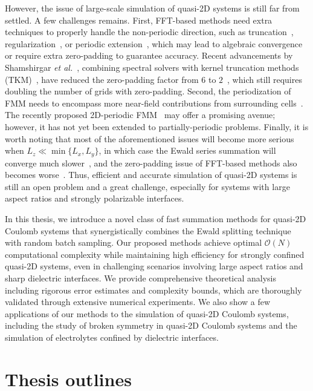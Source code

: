 However, the issue of large-scale simulation of quasi-2D systems is still far from settled.
A few challenges remains. First, FFT-based methods need extra techniques to properly handle the non-periodic direction, such as truncation~\cite{parry1975electrostatic}, regularization~\cite{nestler2015fast}, or periodic extension~\cite{lindbo2012fast}, which may lead to algebraic convergence or require extra zero-padding to guarantee accuracy. 
Recent advancements by Shamshirgar \emph{et al.}~\cite{shamshirgar2021fast}, combining spectral solvers with kernel truncation methods (TKM)~\cite{vico2016fast}, have reduced the zero-padding factor from $6$ to $2$~\cite{lindbo2012fast}, which still requires doubling the number of grids with zero-padding. 
Second, the periodization of FMM needs to encompass more near-field contributions from surrounding cells~\cite{yan2018flexibly,barnett2018unified}. The recently proposed 2D-periodic FMM~\cite{PEI2023111792} may offer a promising avenue; however, it has not yet been extended to partially-periodic problems.
Finally, it is worth noting that most of the aforementioned issues will become more serious when $L_z\ll \min\{L_x, L_y\}$, in which case the Ewald series summation will converge much slower~\cite{arnold2002electrostatics}, and the zero-padding issue of FFT-based methods also becomes worse~\cite{maxian2021fast}.
Thus, efficient and accurate simulation of quasi-2D systems is still an open problem and a great challenge, especially for systems with large aspect ratios and strongly polarizable interfaces.


In this thesis, we introduce a novel class of fast summation methods for quasi-2D Coulomb systems that synergistically combines the Ewald splitting technique with random batch sampling. 
Our proposed methods achieve optimal $\mathcal{O}(N)$ computational complexity while maintaining high efficiency for strongly confined quasi-2D systems, even in challenging scenarios involving large aspect ratios and sharp dielectric interfaces. 
We provide comprehensive theoretical analysis including rigorous error estimates and complexity bounds, which are thoroughly validated through extensive numerical experiments.
We also show a few applications of our methods to the simulation of quasi-2D Coulomb systems, including the study of broken symmetry in quasi-2D Coulomb systems and the simulation of electrolytes confined by dielectric interfaces.

\section{Thesis outlines}

